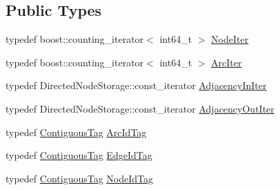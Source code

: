 \subsection*{Public Types}
\begin{DoxyCompactItemize}
\item 
typedef boost\+::counting\+\_\+iterator$<$ int64\+\_\+t $>$ \hyperlink{classnifty_1_1graph_1_1SimpleDirectedGraph_a50b05474da6846da32398e01be9e3d30}{Node\+Iter}
\item 
typedef boost\+::counting\+\_\+iterator$<$ int64\+\_\+t $>$ \hyperlink{classnifty_1_1graph_1_1SimpleDirectedGraph_ad555ff3a9746915c60858cd7d55ae342}{Arc\+Iter}
\item 
typedef Directed\+Node\+Storage\+::const\+\_\+iterator \hyperlink{classnifty_1_1graph_1_1SimpleDirectedGraph_aaf7f58391a2b6e0db7983462dbd6a542}{Adjacency\+In\+Iter}
\item 
typedef Directed\+Node\+Storage\+::const\+\_\+iterator \hyperlink{classnifty_1_1graph_1_1SimpleDirectedGraph_a5af7a4eb6bbc44b805a44bb131786dd0}{Adjacency\+Out\+Iter}
\item 
typedef \hyperlink{structnifty_1_1graph_1_1ContiguousTag}{Contiguous\+Tag} \hyperlink{classnifty_1_1graph_1_1SimpleDirectedGraph_a0e61985b1487d018ab09fcefb2302c99}{Arc\+Id\+Tag}
\item 
typedef \hyperlink{structnifty_1_1graph_1_1ContiguousTag}{Contiguous\+Tag} \hyperlink{classnifty_1_1graph_1_1SimpleDirectedGraph_ad0523e96e29a6feae5c9c003c2dc9e37}{Edge\+Id\+Tag}
\item 
typedef \hyperlink{structnifty_1_1graph_1_1ContiguousTag}{Contiguous\+Tag} \hyperlink{classnifty_1_1graph_1_1SimpleDirectedGraph_a32f9f0f4beaa2cada708f8a51189a96b}{Node\+Id\+Tag}
\end{DoxyCompactItemize}
